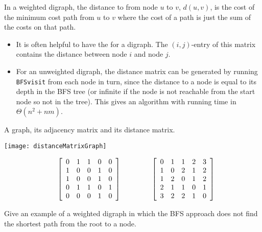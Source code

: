 In a weighted digraph, the distance to from node $u$ to $v$,  $d(u,v)$, is the cost of the minimum cost path from $u$ to $v$ where the cost of a path is just the sum of the costs on that path.


\begin{itemize}
  \item It is often helpful to have the  for a digraph.
  The $(i, j)$-entry of this matrix contains the distance between node $i$ and node $j$.
  \item For an unweighted digraph, the distance matrix can be generated by running \texttt{BFSvisit}
  from each node in turn, since the distance to a node is equal to its depth in the BFS tree 
  (or infinite if the node is not reachable from the start node so not in the tree). 
  This gives an algorithm with running time in $\Theta(n^2 + nm)$.
\end{itemize}

\begin{Boxample}
A graph, its adjacency matrix and its distance matrix.\\

\begin{minipage}[c]{0.3\textwidth}
\centering
\texttt{[image: distanceMatrixGraph]}
\end{minipage}
\begin{minipage}[c]{0.65\textwidth}
$$\quad\left[
\begin{array}{ccccc}
0 & 1 & 1 & 0 & 0 \\
1 & 0 & 0 & 1 & 0 \\
1 & 0 & 0 & 1 & 0 \\
0 & 1 & 1 & 0 & 1 \\
0 & 0 & 0 & 1 & 0 \\
\end{array}
\right]
\hspace{1.5cm}
\left[
\begin{array}{ccccc}
0 & 1 & 1 & 2 & 3 \\
1 & 0 & 2 & 1 & 2 \\
1 & 2 & 0 & 1 & 2 \\
2 & 1 & 1 & 0 & 1 \\
3 & 2 & 2 & 1 & 0 \\
\end{array}
\right]$$
\end{minipage} 
\end{Boxample}

\begin{Boxample}[6]
Give an example of a weighted digraph in which the BFS approach
does not find the shortest path from the root to a node.
\end{Boxample}


